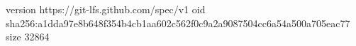 version https://git-lfs.github.com/spec/v1
oid sha256:a1dda97e8b648f354b4cb1aa602c562f0c9a2a9087504cc6a54a500a705eac77
size 32864
